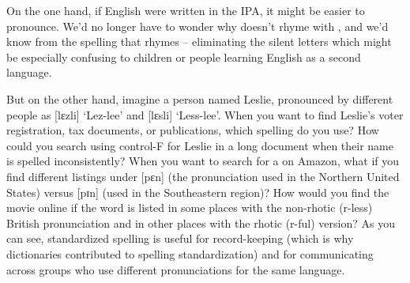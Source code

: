 On the one hand, if English were written in the IPA, it might be easier to pronounce.  We'd no longer have to wonder why  doesn't rhyme with , and we'd know from the spelling that  rhymes  -- eliminating the  silent letters which might be especially confusing to children or people learning English as a second language.

But on the other hand, imagine a person named Leslie, pronounced by different people as  [lɛzli]  `Lez-lee' and  [lɛsli] `Less-lee'.  When you want to find Leslie's voter registration, tax documents, or publications, which spelling do you use?  How could you search using control-F for Leslie in a long document when their name is spelled inconsistently?
When you want to search for a  on Amazon, what if you find different listings under  {[pɛn]}  (the pronunciation used in the Northern United States) versus  [pɪn]  (used in the Southeastern region)?  How would you find the movie  online if the word  is listed in some places with the non-rhotic (r-less) British pronunciation  and in other places with the rhotic (r-ful) version?   As you can see, standardized spelling is useful for record-keeping (which is why dictionaries contributed to spelling standardization) and for communicating across groups who use different pronunciations for the same language.





